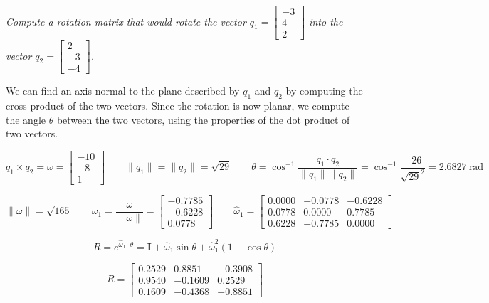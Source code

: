 \documentclass[10pt, oneside, letter]{article}
\begin{document}
	\it Compute a rotation matrix that would rotate the vector $q_1 = \left[ \begin{array}{r}
	  -3 \\
	  4 \\
	  2
	\end{array} \right]$ into the vector $q_2 = \left[ \begin{array}{r}
	  2 \\
	  -3 \\
	  -4
	\end{array} \right]$. \rm
	
	We can find an axis normal to the plane described by $q_1$ and $q_2$ by computing the cross product of the two vectors. Since the rotation is now planar, we compute the angle $\theta$ between the two vectors, using the properties of the dot product of two vectors. 
	
	$$q_1 \times q_2 = \omega = \left[ \begin{array}{r}
	  -10 \\
	  -8 \\
	  1
	\end{array} \right] \qquad
	{\| q_1 \|} = {\| q_2 \|} = \sqrt{29} \qquad 
	\theta = \cos^{-1}{\dfrac{q_1 \cdot q_2}{\| q_1 \| \| q_2 \|}} = \cos^{-1}{\dfrac{-26}{\sqrt{29}^2}} = 2.6827 \mathrm{\ rad}$$
	
	$$\| \omega \| = \sqrt{165} \qquad
	\omega_1 = \dfrac{\omega}{\| \omega \|} = \left[ \begin{array}{r}
	  -0.7785 \\
	  -0.6228 \\
	  0.0778
	\end{array} \right] \qquad
	\hat{\omega}_1 = \left[ \begin{array}{ccc}
	  0.0000 & -0.0778 & -0.6228 \\
	  0.0778 & 0.0000 & 0.7785 \\
	  0.6228 & -0.7785 & 0.0000
	\end{array} \right] $$
	
	$$R =  e^{\hat{\omega}_1 \cdot \theta} = \mathbf{I} +\hat{\omega}_1 \sin{\theta} + \hat{\omega}_{1}^2(1 - \cos{\theta})$$
	
	$$\boxed{R = \left[ \begin{array}{ccc}
	  0.2529 & 0.8851 & -0.3908 \\
	  0.9540 & -0.1609 & 0.2529 \\
	  0.1609 & -0.4368 & -0.8851
	\end{array} \right] }$$
	
\end{document}
